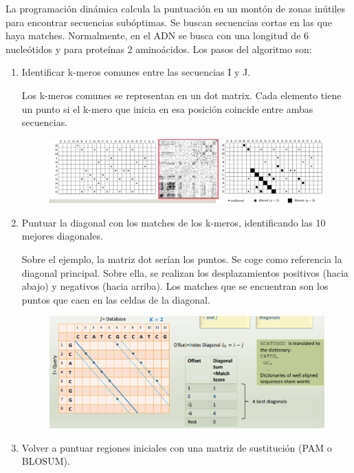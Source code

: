 La programación dinámica calcula la puntuación en un montón de zonas inútiles para encontrar secuencias subóptimas. Se buscan secuencias cortas en las que haya matches. Normalmente, en el ADN se busca con una longitud de 6 nucleótidos y para proteínas 2 aminoácidos. 
Los pasos del algoritmo son:
\begin{enumerate}
\item Identificar k-meros comunes entre las secuencias I y J.

Los k-meros comunes se representan en un dot matrix. Cada elemento tiene un punto si el k-mero que inicia en esa posición coincide entre ambas secuencias.
\begin{figure}[h]
\centering
\includegraphics[width = \textwidth]{figs/dotmatrix.png}
\end{figure}

\item Puntuar la diagonal con los matches de los k-meros, identificando las 10 mejores diagonales.

Sobre el ejemplo, la matriz dot serían los puntos. Se coge como referencia la diagonal principal. Sobre ella, se realizan los desplazamientos positivos (hacia abajo) y negativos (hacia arriba). Los matches que se encuentran son los puntos que caen en las celdas de la diagonal. 
\begin{figure}[h]
\centering
\includegraphics[width = \textwidth]{figs/diagonal-sums.png}
\end{figure}

\item Volver a puntuar regiones iniciales con una matriz de sustitución (PAM o BLOSUM).


\end{enumerate}
